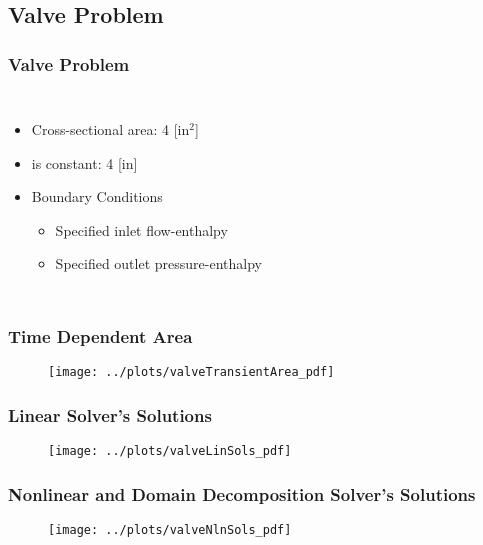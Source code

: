 \documentclass[compress,xcolor=table]{beamer}
\begin{document}
\subsection[Valve Problem]{Valve Problem}
\begin{frame}
\frametitle{Valve Problem}
\begin{columns}

\begin{itemize}
\item{Cross-sectional area: 4 [in$^2$]}
\item{\dx{} is constant: 4 [in]}
\item{ Boundary Conditions
	\begin{itemize}
	\item{Specified inlet flow-enthalpy}
	\item{Specified outlet pressure-enthalpy}
\end{itemize}
}
\end{itemize}

\begin{figure}[h!t]
\centering
\resizebox{\textwidth}{0.6\textheight}{

}

\end{figure}
\end{columns}
\end{frame}
\begin{frame}
\frametitle{Time Dependent Area }

\begin{figure}[h!t]
\centering
\texttt{[image: ../plots/valveTransientArea\_pdf]}
\end{figure}

\end{frame}
\begin{frame}
\frametitle{Linear Solver's Solutions}

\begin{figure}[h!t]
\centering
\texttt{[image: ../plots/valveLinSols\_pdf]}
\end{figure}

\end{frame}
\begin{frame}
\frametitle{Nonlinear and Domain Decomposition Solver's Solutions}

\begin{figure}[h!t]
\centering
\texttt{[image: ../plots/valveNlnSols\_pdf]}
\end{figure}

\end{frame}
\end{document}
